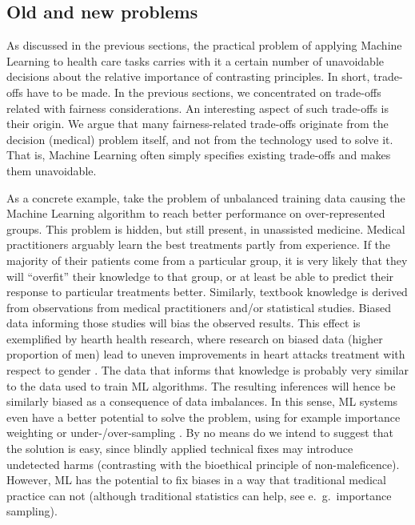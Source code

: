 \subsection{Old and new problems}
As discussed in the previous sections, the practical problem of applying Machine Learning to health care tasks carries with it a certain number of unavoidable decisions about the relative importance of contrasting principles.
In short, trade-offs have to be made.
In the previous sections, we concentrated on trade-offs related with fairness considerations.
An interesting aspect of such trade-offs is their origin.
We argue that many fairness-related trade-offs originate from the decision (medical) problem itself, and not from the technology used to solve it.
That is, Machine Learning often simply specifies existing trade-offs and makes them unavoidable.

As a concrete example, take the problem of unbalanced training data causing the Machine Learning algorithm to reach better performance on over-represented groups.
This problem is hidden, but still present, in unassisted medicine.
Medical practitioners arguably learn the best treatments partly from experience.
If the majority of their patients come from a particular group, it is very likely that they will ``overfit'' their knowledge to that group, or at least be able to predict their response to particular treatments better.
Similarly, textbook knowledge is derived from observations from medical practitioners and/or statistical studies.
Biased data informing those studies will bias the observed results.
This effect is exemplified by hearth health research, where research on biased data (higher proportion of men) lead to uneven improvements in heart attacks treatment with respect to gender \cite[e221]{Mccradden2020}.
The data that informs that knowledge is probably very similar to the data used to train ML algorithms.
The resulting inferences will hence be similarly biased as a consequence of data imbalances.
In this sense, ML systems even have a better potential to solve the problem, using for example importance weighting or under-/over-sampling \cite[pp.~6-8]{Chen2021}.
By no means do we intend to suggest that the solution is easy, since blindly applied technical fixes may introduce undetected harms (contrasting with the bioethical principle of non-maleficence).
However, ML has the potential to fix biases in a way that traditional medical practice can not \cite[p.~e222]{Mccradden2020} (although traditional statistics can help, see e.~g.~importance sampling).

